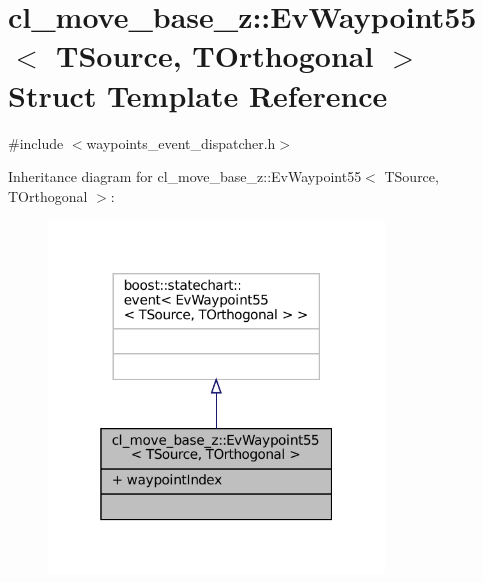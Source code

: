 \hypertarget{structcl__move__base__z_1_1EvWaypoint55}{}\section{cl\+\_\+move\+\_\+base\+\_\+z\+:\+:Ev\+Waypoint55$<$ T\+Source, T\+Orthogonal $>$ Struct Template Reference}
\label{structcl__move__base__z_1_1EvWaypoint55}


{\ttfamily \#include $<$waypoints\+\_\+event\+\_\+dispatcher.\+h$>$}



Inheritance diagram for cl\+\_\+move\+\_\+base\+\_\+z\+:\+:Ev\+Waypoint55$<$ T\+Source, T\+Orthogonal $>$\+:
\nopagebreak
\begin{figure}[H]
\begin{center}
\leavevmode
\includegraphics[width=253pt]{structcl__move__base__z_1_1EvWaypoint55__inherit__graph}
\end{center}
\end{figure}


